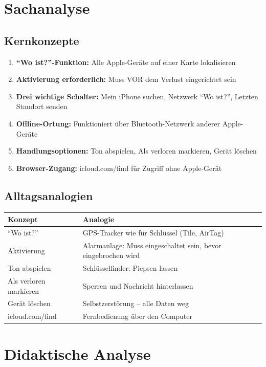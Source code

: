 \documentclass[11pt,a4paper]{article}
\begin{document}
\section{Sachanalyse}

\subsection{Kernkonzepte}
\begin{enumerate}
    \item \textbf{``Wo ist?''-Funktion:} Alle Apple-Geräte auf einer Karte lokalisieren
    \item \textbf{Aktivierung erforderlich:} Muss VOR dem Verlust eingerichtet sein
    \item \textbf{Drei wichtige Schalter:} Mein iPhone suchen, Netzwerk ``Wo ist?'', Letzten Standort senden
    \item \textbf{Offline-Ortung:} Funktioniert über Bluetooth-Netzwerk anderer Apple-Geräte
    \item \textbf{Handlungsoptionen:} Ton abspielen, Als verloren markieren, Gerät löschen
    \item \textbf{Browser-Zugang:} icloud.com/find für Zugriff ohne Apple-Gerät
\end{enumerate}

\subsection{Alltagsanalogien}
\begin{tabular}{|l|p{8cm}|}
\hline
\textbf{Konzept} & \textbf{Analogie} \\
\hline
``Wo ist?'' & GPS-Tracker wie für Schlüssel (Tile, AirTag) \\
Aktivierung & Alarmanlage: Muss eingeschaltet sein, bevor eingebrochen wird \\
Ton abspielen & Schlüsselfinder: Piepsen lassen \\
Als verloren markieren & Sperren und Nachricht hinterlassen \\
Gerät löschen & Selbstzerstörung -- alle Daten weg \\
icloud.com/find & Fernbedienung über den Computer \\
\hline
\end{tabular}

\section{Didaktische Analyse}
\end{document}
